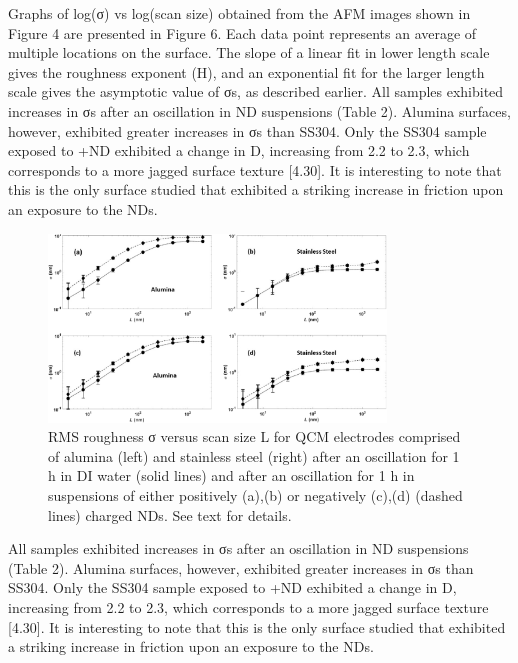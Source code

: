 Graphs of log(σ) vs log(scan size) obtained from the AFM images shown in Figure 4 are presented in Figure 6. Each data point represents an average of multiple locations on the surface. The slope of a linear fit in lower length scale gives the roughness exponent (H), and an exponential fit for the larger length scale gives the asymptotic value of σs, as described earlier.
All samples exhibited increases in σs after an oscillation in ND suspensions (Table 2). Alumina surfaces, however, exhibited greater increases in σs than SS304. Only the SS304 sample exposed to +ND exhibited a change in D, increasing from 2.2 to 2.3, which corresponds to a more jagged surface texture [4.30]. It is interesting to note that this is the only surface studied that exhibited a striking increase in friction upon an exposure to the NDs.


\begin{figure}[hbtp]
	\centering
	\includegraphics[width=0.8\textwidth]{Chapter-4/fig6_png}
	\caption{RMS roughness σ versus scan size L for QCM electrodes comprised of alumina (left) and stainless steel (right) after an oscillation for 1 h in DI water (solid lines) and after an oscillation for 1 h in suspensions of either positively (a),(b) or negatively (c),(d) (dashed lines) charged NDs. See text for details.}
	\label{fig6:AFM images}
\end{figure} 


All samples exhibited increases in σs after an oscillation in ND suspensions (Table 2). Alumina surfaces, however, exhibited greater increases in σs than SS304. Only the SS304 sample exposed to +ND exhibited a change in D, increasing from 2.2 to 2.3, which corresponds to a more jagged surface texture [4.30]. It is interesting to note that this is the only surface studied that exhibited a striking increase in friction upon an exposure to the NDs.

